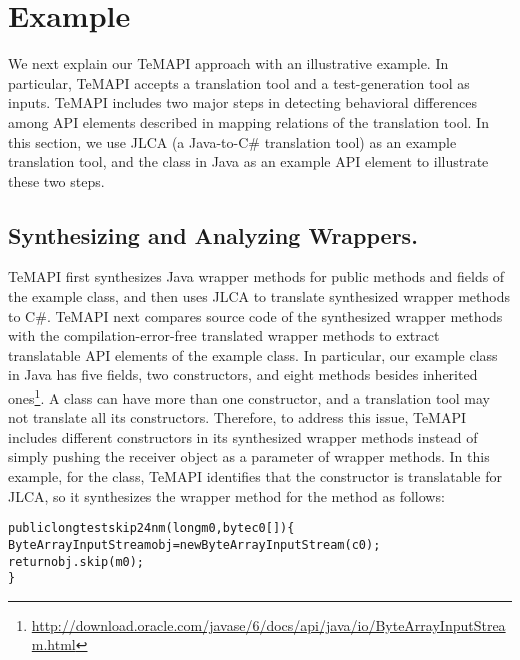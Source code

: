 \section{Example}
\label{sec:example}

We next explain our TeMAPI approach with an illustrative example. In particular, TeMAPI accepts a translation tool and a test-generation tool as inputs. TeMAPI includes two major steps in detecting behavioral differences among API elements described in mapping relations of the translation tool. In this section, we use JLCA (a Java-to-C\# translation tool) as an example translation tool, and the  class in Java as an example API element to illustrate these two steps.


\subsection{Synthesizing and Analyzing Wrappers.} TeMAPI first synthesizes Java wrapper methods for public methods and fields of the example class, and then uses JLCA to translate synthesized wrapper methods to C\#. TeMAPI next compares source code of the synthesized wrapper methods with the compilation-error-free translated wrapper methods to extract translatable API elements of the example class. In particular, our example class in Java has five fields, two constructors, and eight methods besides inherited ones\footnote{\url{http://download.oracle.com/javase/6/docs/api/java/io/ByteArrayInputStream.html}}. A class can have more than one constructor, and a translation tool may not translate all its constructors. Therefore, to address this issue, TeMAPI includes different constructors in its synthesized wrapper methods instead of simply pushing the receiver object as a parameter of wrapper methods. In this example, for the  class, TeMAPI identifies that the  constructor is translatable for JLCA, so it synthesizes the wrapper method for the  method as follows:

\begin{CodeOut}%
\begin{alltt}
public long testskip24nm(long m0, byte c0[])\{
  ByteArrayInputStream obj = new ByteArrayInputStream(c0);
  return obj.skip(m0);
\}
\end{alltt}
\end{CodeOut}%


